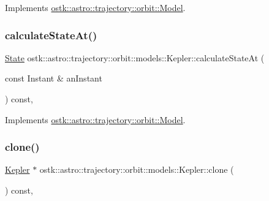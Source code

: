 Implements \hyperlink{classostk_1_1astro_1_1trajectory_1_1orbit_1_1_model_aeecf4cc22fa9c766801936c468cc52ac}{ostk\+::astro\+::trajectory\+::orbit\+::\+Model}.

\mbox{\label{classostk_1_1astro_1_1trajectory_1_1orbit_1_1models_1_1_kepler_a4de0c3d7a2b37c1c2ab4d6e207339809}} 
\subsubsection{\texorpdfstring{calculate\+State\+At()}{calculateStateAt()}}
{\footnotesize\ttfamily \hyperlink{classostk_1_1astro_1_1trajectory_1_1_state}{State} ostk\+::astro\+::trajectory\+::orbit\+::models\+::\+Kepler\+::calculate\+State\+At (\begin{DoxyParamCaption}\item[{const Instant \&}]{an\+Instant }\end{DoxyParamCaption}) const\hspace{0.3cm}{\ttfamily [override]}, {\ttfamily [virtual]}}



Implements \hyperlink{classostk_1_1astro_1_1trajectory_1_1orbit_1_1_model_a34a0d8979ec1f7ade3e434fc0dad3711}{ostk\+::astro\+::trajectory\+::orbit\+::\+Model}.

\mbox{\label{classostk_1_1astro_1_1trajectory_1_1orbit_1_1models_1_1_kepler_afb76b3571c73fb5c87129033f7d66520}} 
\subsubsection{\texorpdfstring{clone()}{clone()}}
{\footnotesize\ttfamily \hyperlink{classostk_1_1astro_1_1trajectory_1_1orbit_1_1models_1_1_kepler}{Kepler} $\ast$ ostk\+::astro\+::trajectory\+::orbit\+::models\+::\+Kepler\+::clone (\begin{DoxyParamCaption}{ }\end{DoxyParamCaption}) const\hspace{0.3cm}{\ttfamily [override]}, {\ttfamily [virtual]}}



